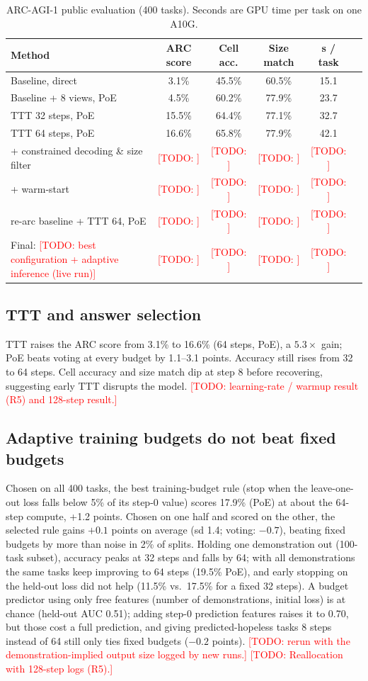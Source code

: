 \documentclass{article}
\newcommand{\todo}[1]{\textcolor{red}{[TODO: #1]}}
\begin{document}
\begin{table}[t]
\centering
\caption{ARC-AGI-1 public evaluation (400 tasks). Seconds are GPU time per task on one A10G.}
\label{tab:main}
\small
\begin{tabular}{lccccc}
\toprule
Method & ARC score & Cell acc. & Size match & s / task \\
\midrule
Baseline, direct & 3.1\% & 45.5\% & 60.5\% & 15.1 \\
Baseline + 8 views, PoE & 4.5\% & 60.2\% & 77.9\% & 23.7 \\
TTT 32 steps, PoE & 15.5\% & 64.4\% & 77.1\% & 32.7 \\
TTT 64 steps, PoE & 16.6\% & 65.8\% & 77.9\% & 42.1 \\
\midrule
+ constrained decoding \& size filter & \todo{} & \todo{} & \todo{} & \todo{} \\
+ warm-start & \todo{} & \todo{} & \todo{} & \todo{} \\
re-arc baseline + TTT 64, PoE & \todo{} & \todo{} & \todo{} & \todo{} \\
Final: \todo{best configuration + adaptive inference (live run)} & \todo{} & \todo{} & \todo{} & \todo{} \\
\bottomrule
\end{tabular}
\end{table}

\subsection{TTT and answer selection}
TTT raises the ARC score from 3.1\% to 16.6\% (64 steps, PoE), a $5.3\times$ gain; PoE beats voting at every budget by 1.1--3.1 points. Accuracy still rises from 32 to 64 steps. Cell accuracy and size match dip at step 8 before recovering, suggesting early TTT disrupts the model. \todo{learning-rate / warmup result (R5) and 128-step result.}

\subsection{Adaptive training budgets do not beat fixed budgets}
Chosen on all 400 tasks, the best training-budget rule (stop when the leave-one-out loss falls below 5\% of its step-0 value) scores 17.9\% (PoE) at about the 64-step compute, +1.2 points. Chosen on one half and scored on the other, the selected rule gains $+0.1$ points on average (sd 1.4; voting: $-0.7$), beating fixed budgets by more than noise in 2\% of splits. Holding one demonstration out (100-task subset), accuracy peaks at 32 steps and falls by 64; with all demonstrations the same tasks keep improving to 64 steps (19.5\% PoE), and early stopping on the held-out loss did not help (11.5\% vs.\ 17.5\% for a fixed 32 steps). A budget predictor using only free features (number of demonstrations, initial loss) is at chance (held-out AUC 0.51); adding step-0 prediction features raises it to 0.70, but those cost a full prediction, and giving predicted-hopeless tasks 8 steps instead of 64 still only ties fixed budgets ($-0.2$ points). \todo{rerun with the demonstration-implied output size logged by new runs.} \todo{Reallocation with 128-step logs (R5).}
\end{document}
